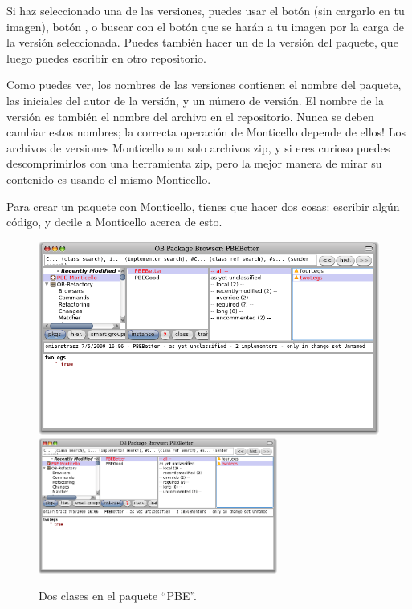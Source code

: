 \documentclass[spanish,a4paper,10pt,twoside]{book}
\begin{document}
Si haz seleccionado una de las versiones, puedes usar el bot\'on  (sin cargarlo en tu imagen), bot\'on  , o buscar con el bot\'on  que se har\'an a tu imagen por la carga de la versi\'on seleccionada. Puedes tambi\'en hacer un  de la versi\'on del paquete, que luego puedes escribir en otro repositorio.

Como puedes ver, los nombres de las versiones contienen el nombre del paquete, las iniciales del autor de la versi\'on, y un n\'umero de versi\'on.  El nombre de la versi\'on es tambi\'en el nombre del archivo en el repositorio.  Nunca se deben cambiar estos nombres; la correcta operaci\'on de Monticello depende de ellos!   Los archivos de versiones Monticello son solo archivos zip, y si eres curioso puedes descomprimirlos con una herramienta zip, pero la mejor manera de mirar su contenido es usando el mismo Monticello.

Para crear un paquete con Monticello, tienes que hacer dos cosas: escribir alg\'un c\'odigo, y decile a Monticello acerca de esto.


\begin{figure}[btp]
	\begin{center}
	\ifluluelse
		{\includegraphics[width=\textwidth]{MCnewcategory}}
		{\includegraphics[width=0.7\textwidth]{MCnewcategory}}
	\end{center}
	\caption{Dos clases en el paquete ``PBE''.}
\end{figure}
\end{document}
